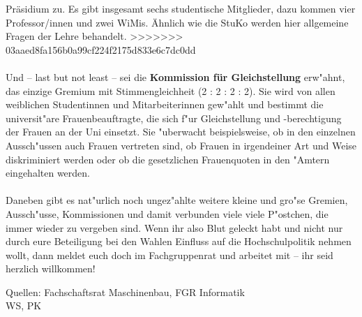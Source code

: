 Präsidium zu. Es gibt insgesamt sechs studentische Mitglieder, dazu kommen vier Professor/innen und zwei WiMis. 
Ähnlich wie die StuKo werden hier allgemeine Fragen der Lehre behandelt.
>>>>>>> 03aaed8fa156b0a99cf224f2175d833e6c7dc0dd
\\
\\
Und -- last but not least -- sei die \textbf{Kommission für Gleichstellung} 
erw"ahnt, das einzige Gremium mit Stimmengleichheit (2 : 2 : 2 : 2). Sie wird von allen 
weiblichen Studentinnen und Mitarbeiterinnen gew"ahlt und bestimmt 
 die universit"are Frauenbeauftragte, die sich f"ur Gleichstellung und 
-berechtigung der Frauen an der Uni einsetzt. Sie "uberwacht beispielsweise, ob 
in den einzelnen Aussch"ussen auch Frauen vertreten sind, ob Frauen in 
irgendeiner Art und Weise diskriminiert werden oder ob die gesetzlichen 
Frauenquoten in den "Amtern eingehalten werden. 
\\
\\
Daneben gibt es nat"urlich noch ungez"ahlte weitere kleine und gro"se Gremien, 
Aussch"usse, Kommissionen und damit verbunden viele viele P"ostchen, die immer 
wieder zu vergeben sind. Wenn ihr also Blut geleckt habt und nicht nur durch 
eure Beteiligung bei den Wahlen Einfluss auf die Hochschulpolitik nehmen wollt, 
dann meldet euch doch im Fachgruppenrat und arbeitet mit -- ihr seid herzlich 
willkommen!

{Quellen: Fachschaftsrat Maschinenbau, FGR Informatik\\WS, PK}
